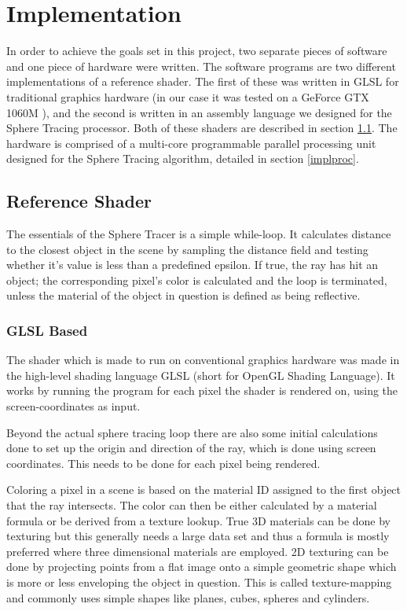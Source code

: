 \chapter{Implementation}

	In order to achieve the goals set in this project, two separate pieces of 
	software and one piece of hardware were written. The software programs are 
	two different implementations of a reference shader. The first of these was 
	written in GLSL for traditional graphics hardware (in our case it was 
	tested on a GeForce GTX 1060M ), and the second is written in an assembly 
	language we designed for the Sphere Tracing processor. Both of these 
	shaders are described in section \ref{implshader}. The hardware is 
	comprised of a multi-core programmable parallel processing unit designed 
	for the Sphere Tracing algorithm, detailed in section \ref{implproc}.

	\section{Reference Shader} \label{implshader}

		The essentials of the Sphere Tracer is a simple while-loop. It
		calculates distance to the closest object in the scene by sampling
		the distance field and testing whether it's value is less than a
		predefined epsilon. If true, the ray has hit an object; the
		corresponding pixel's color is calculated and the loop is
		terminated, unless the material of the object in question is
		defined as being reflective.

		\subsection{GLSL Based}

			The shader which is made to run on conventional graphics hardware
			was made in the high-level shading language GLSL (short for OpenGL
			Shading Language). It works by running the program for each pixel
			the shader is rendered on, using the screen-coordinates as input.

			Beyond the actual sphere tracing loop there are also some initial
			calculations done to set up the origin and direction of the ray,
			which is done using screen coordinates. This needs to be done for
			each pixel being rendered.

			Coloring a pixel in a scene is based on the material ID
			assigned to the first object that the ray intersects. The color
			can then be either calculated by a material formula or be 
			derived from a texture lookup. True 3D materials can be done by
			texturing but this generally needs a large data set and thus a 
			formula is mostly preferred where three dimensional materials 
			are employed. 2D texturing can be done by projecting points from
			a flat image onto a simple geometric shape  which is more or less 
			enveloping the object in question. This is called texture-mapping 
			and commonly uses simple shapes like planes, cubes, spheres and 
			cylinders. 

